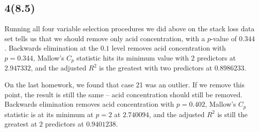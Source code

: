 \documentclass{article}
\begin{document}
\subsection*{4(8.5)}
Running all four variable selection procedures we did above on the stack loss data set tells us that we should remove only acid concentration, with a $p$-value of $0.344$. Backwards elimination at the $0.1$ level removes acid concentration with $p=0.344$, Mallow's $C_p$ statistic hits its minimum value with 2 predictors at $2.947332$, and the adjusted $R^2$ is the greatest with two predictors at $0.8986233$. 

On the last homework, we found that case 21 was an outlier. If we remove this point, the result is still the same -- acid concentration should still be removed. Backwards elimination removes acid concentration with $p=0.402$, Mallow's $C_p$ statistic is at its minimum at $p=2$ at $2.740094$, and the adjusted $R^2$ is still the greatest at $2$ predictors at $ 0.9401238$.
\end{document}
